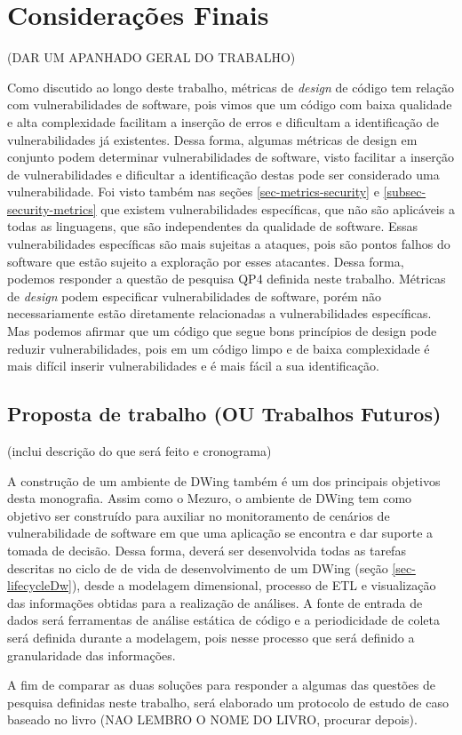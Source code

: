 \chapter{Considerações Finais}
\label{cap-consideracoesFinais}


(DAR UM APANHADO GERAL DO TRABALHO)



Como discutido ao longo deste trabalho, métricas de \emph{design} de código tem relação com  vulnerabilidades de software, pois vimos que um código com baixa qualidade e alta complexidade facilitam a inserção de erros e dificultam a identificação de vulnerabilidades já existentes. Dessa forma, algumas métricas de design em conjunto podem determinar vulnerabilidades de software, visto facilitar a inserção de vulnerabilidades e dificultar a identificação destas pode ser considerado uma vulnerabilidade. Foi visto também nas seções \ref{sec-metrics-security} e \ref{subsec-security-metrics} que existem vulnerabilidades específicas, que não são aplicáveis a todas as linguagens, que são independentes da qualidade de software. Essas vulnerabilidades específicas são mais sujeitas a ataques, pois são pontos falhos do software que estão sujeito a exploração por esses atacantes. Dessa forma, podemos responder a questão de pesquisa QP4 definida neste trabalho. Métricas de \emph{design} podem especificar vulnerabilidades de software, porém não necessariamente estão diretamente relacionadas a vulnerabilidades específicas. Mas podemos afirmar que um código que segue bons princípios de design pode reduzir vulnerabilidades, pois em um código limpo e de baixa complexidade é mais difícil inserir vulnerabilidades e é mais fácil a sua identificação.






\section{Proposta de trabalho (OU Trabalhos Futuros)}

(inclui descrição do que será feito e cronograma)


%

A construção de um ambiente de DWing também é um dos principais objetivos desta monografia. Assim como o Mezuro, o ambiente de DWing tem como objetivo ser construído para auxiliar no monitoramento de cenários de vulnerabilidade de software em que uma aplicação se encontra e dar suporte a tomada de decisão. Dessa forma, deverá ser desenvolvida todas as tarefas descritas no ciclo de de vida de desenvolvimento de um DWing (seção \ref{sec-lifecycleDw}), desde a modelagem dimensional, processo de ETL e visualização das informações obtidas para a realização de análises. A fonte de entrada de dados será ferramentas de análise estática de código e a periodicidade de coleta será definida durante a modelagem, pois nesse processo que será definido a granularidade das informações.

%

A fim de comparar as duas soluções para responder a algumas das questões de pesquisa definidas neste trabalho, será elaborado um protocolo de estudo de caso baseado no livro (NAO LEMBRO O NOME DO LIVRO, procurar depois). 